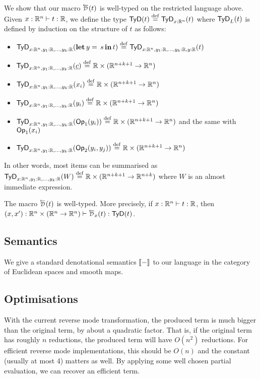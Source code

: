 We show that our macro $\Dsynrev[]{t}$ is well-typed on the restricted language above. Given $x:\mathbb{R}^n\vdash t:\mathbb{R}$, we define the type $\mathsf{TyD}(t)\stackrel {\mathrm{def}}=\mathsf{TyD}_{x:\mathbb{R}^n}(t)$ where $\mathsf{TyD}_{L}(t)$ is defined by induction on the structure of $t$ as follows:
\begin{itemize}
	\item $\mathsf{TyD}_{x:\mathbb{R}^n,y_1:\mathbb{R},\ldots,y_k:\mathbb{R}}(\mathbf{let}\,y=\,s\,\mathbf{in}\,t)\stackrel {\mathrm{def}}= \mathsf{TyD}_{x:\mathbb{R}^n,y_1:\mathbb{R},\ldots,y_k:\mathbb{R},y:\mathbb{R}}(t)$
	\item $\mathsf{TyD}_{x:\mathbb{R}^n,y_1:\mathbb{R},\ldots,y_k:\mathbb{R}}(\underline{c})\stackrel {\mathrm{def}}= \mathbb{R}\times (\mathbb{R}^{n+k+1}\to \mathbb{R}^{n})$
	\item $\mathsf{TyD}_{x:\mathbb{R}^n,y_1:\mathbb{R},\ldots,y_k:\mathbb{R}}(x_i)\stackrel {\mathrm{def}}=\mathbb{R}\times (\mathbb{R}^{n+k+1}\to \mathbb{R}^{n})$
	\item $\mathsf{TyD}_{x:\mathbb{R}^n,y_1:\mathbb{R},\ldots,y_k:\mathbb{R}}(y_i)\stackrel {\mathrm{def}}=\mathbb{R}\times (\mathbb{R}^{n+k+1}\to \mathbb{R}^{n})$
	\item $\mathsf{TyD}_{x:\mathbb{R}^n,y_1:\mathbb{R},\ldots,y_k:\mathbb{R}}(\mathsf{Op}_1(y_i))\stackrel {\mathrm{def}}= \mathbb{R}\times (\mathbb{R}^{n+k+1}\to \mathbb{R}^{n})$ and the same with $\mathsf{Op}_1(x_i)$
	\item $\mathsf{TyD}_{x:\mathbb{R}^n,y_1:\mathbb{R},\ldots,y_k:\mathbb{R}}(\mathsf{Op}_2(y_i,y_j))\stackrel {\mathrm{def}}= \mathbb{R}\times (\mathbb{R}^{n+k+1}\to \mathbb{R}^{n})$
\end{itemize}

In other words, most items can be summarised as $\mathsf{TyD}_{x:\mathbb{R}^n,y_1:\mathbb{R},\ldots,y_k:\mathbb{R}}(W)\stackrel {\mathrm{def}}= \mathbb{R}\times (\mathbb{R}^{n+k+1}\to \mathbb{R}^{n+k})$ where $W$ is an almost immediate expression.

\begin{lemma}
	The macro $\Dsynrev[]{t}$ is well-typed. More precisely, if $x:\mathbb{R}^n\vdash t:\mathbb{R}$, then $(x,x'):\RR^n\times (\RR^n\to\RR^n)\vdash \Dsynrev[x]{t}:\TyD{t}$.
\end{lemma}


\subsection{Semantics} 
\label{sub:Semantics}

We give a standard denotational semantics $\llbracket -\rrbracket$ to our language in the category of Euclidean spaces and smooth maps.

\subsection{Optimisations}

With the current reverse mode transformation, the produced term is much bigger than the original term, by about a quadratic factor. 
That is, if the original term has roughly $n$ reductions, the produced term will have $O(n^2)$ reductions. 
For efficient reverse mode implementations, this should be $O(n)$ and the constant (usually at most 4) matters as well.
By applying some well chosen partial evaluation, we can recover an efficient term.

